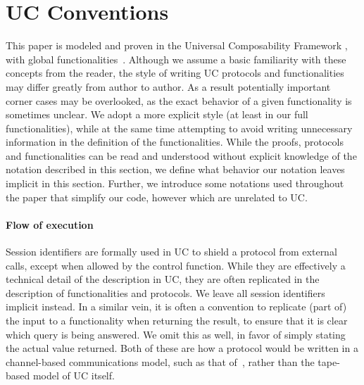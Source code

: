 \section{UC Conventions}
\label{sec:conventions}

This paper is modeled and proven in the Universal Composability Framework
\cite{FOCS:Canetti01}, with global functionalities~\cite{TCC:CDPW07}. Although
we assume a basic familiarity with these concepts from the reader, the style of
writing UC protocols and functionalities may differ greatly from author to
author. As a result potentially important corner cases may be overlooked, as the
exact behavior of a given functionality is sometimes unclear. We adopt a more
explicit style (at least in our full functionalities), while at the same time
attempting to avoid writing unnecessary information in the definition of the
functionalities. While the proofs, protocols and functionalities can be read and
understood without explicit knowledge of the notation described in this section,
we define what behavior our notation leaves implicit in this section. Further, we
introduce some notations used throughout the paper that simplify our code,
however which are unrelated to UC.

\paragraph{Flow of execution}

Session identifiers are formally used in UC to shield a protocol from external
calls, except when allowed by the control function. While they are effectively a
technical detail of the description in UC, they are often replicated in the
description of functionalities and protocols. We leave all session identifiers
implicit instead. In a similar vein, it is often a convention to replicate (part
of) the input to a functionality when returning the result, to ensure that it is
clear which
query is being answered. We omit this as well, in favor of simply
stating the actual value returned. Both of these are how a protocol would be
written in a channel-based communications model, such as that of~\cite{cc}, rather
than the tape-based model of UC itself.

